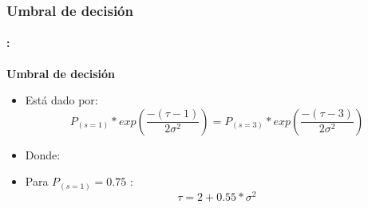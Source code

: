 \begin{frame}
\begin{columns}
\begin{column}{0.48\paperwidth}
    \end{column}
\end{columns}
\end{frame}


\begin{frame}
  \frametitle{\textbf{Umbral de decisión}}
\framesubtitle{\secname : \subsecname}
     \begin{block}{\centering \textbf{Umbral de decisión}}
     \begin{itemize}
        \item Está dado por: 
             \begin{equation*}
            P_{(s=1)}* exp{(\frac{-(\tau-1)}{2{\sigma}^{2}})} =  P_{(s=3)}* exp{(\frac{-(\tau-3)}{2{\sigma}^{2}})}
            \end{equation*}
    \item Donde:
    \item  Para $P_{(s=1)}=0.75$ :
        \begin{equation*}
            \tau = 2 + 0.55  *{\sigma}^{2}
        \end{equation*}
    \end{itemize}
    \end{block}
\end{frame}